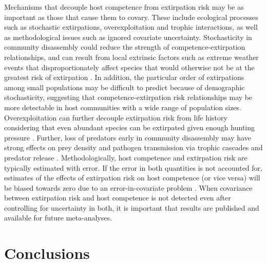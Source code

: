 Mechanisms that decouple host competence from extirpation risk may be as important as those that cause them to covary.
These include ecological processes such as stochastic extirpations, overexploitation and trophic interactions, as well as methodological issues such as ignored covariate uncertainty.
Stochasticity in community disassembly could reduce the strength of competence-extirpation relationships, and can result from local extrinsic factors such as extreme weather events that disproportionately affect species that would otherwise not be at the greatest risk of extirpation \citep{Lande1993}.
In addition, the particular order of extirpations among small populations may be difficult to predict because of demographic stochasticity, suggesting that competence-extirpation risk relationships may be more detectable in host communities with a wide range of population sizes.
Overexploitation can further decouple extirpation risk from life history considering that even abundant species can be extirpated given enough hunting pressure \citep{Gaston2008}.
Further, loss of predators early in community disassembly may have strong effects on prey density and pathogen transmission via trophic cascades and predator release \citep{Ostfeld2004a, Dobson2006, Bruno2008, Levi2012}.
Methodologically, host competence and extirpation risk are typically estimated with error.
If the error in both quantities is not accounted for, estimates of the effects of extirpation risk on host competence (or vice versa) will be biased towards zero due to an error-in-covariate problem \citep{Pearson1901}.
When covariance between extirpation risk and host competence is not detected even after controlling for uncertainty in both, it is important that results are published and available for future meta-analyses.

\section{Conclusions}

